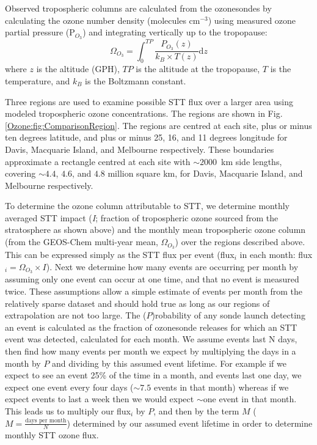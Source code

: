     Observed tropospheric columns are calculated from the ozonesondes by calculating the ozone number density (molecules cm$^{-3}$) using measured ozone partial pressure (P$_{O_3}$) and integrating vertically up to the tropopause:
    \begin{equation*} \Omega_{O_3} = \int_{0}^{TP} \frac{P_{O_3}(z)}{k_B \times T(z)} \mathrm{d}z \end{equation*}
    where $z$ is the altitude (GPH), $TP$ is the altitude at the tropopause, $T$ is the temperature, and $k_B$ is the Boltzmann constant.
    
    Three regions are used to examine possible STT flux over a larger area using modeled tropospheric ozone concentrations.
    The regions are shown in Fig. \ref{Ozone:fig:ComparisonRegion}.
    The regions are centred at each site, plus or minus ten degrees latitude, and plus or minus 25, 16, and 11 degrees longitude for Davis, Macquarie Island, and Melbourne respectively.
    These boundaries approximate a rectangle centred at each site with $\sim 2000$~km side lengths, covering $\sim 4.4$, $4.6$, and $4.8$ million square km, for Davis, Macquarie Island, and Melbourne respectively.
    
    To determine the ozone column attributable to STT, we determine monthly averaged STT impact (\textit{I}; fraction of tropospheric ozone sourced from the stratosphere as shown above) and the monthly mean tropospheric ozone column (from the GEOS-Chem multi-year mean, $\Omega_{O_3}$) over the regions described above.
    This can be expressed simply as the STT flux per event (flux$_i$ in each month: flux$_i = \Omega_{O_3} \times I$).
    Next we determine how many events are occurring per month by assuming only one event can occur at one time, and that no event is measured twice.
    These assumptions allow a simple estimate of events per month from the relatively sparse dataset and should hold true as long as our regions of extrapolation are not too large.
    The ($P$)robability of any sonde launch detecting an event is calculated as the fraction of ozonesonde releases for which an STT event was detected, calculated for each month.
    We assume events last N days, then find how many events per month we expect by multiplying the days in a month by $P$ and dividing by this assumed event lifetime.
    For example if we expect to see an event 25\% of the time in a month, and events last one day, we expect one event every four days ($\sim 7.5$ events in that month) whereas if we expect events to last a week then we would expect $\sim$one event in that month.
    This leads us to multiply our flux$_i$ by $P$, and then by the term $M$ ($M= \frac{\text{days per month}}{N}$) determined by our assumed event lifetime in order to determine monthly STT ozone flux.
    
